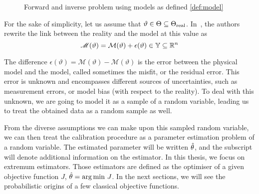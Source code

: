 \documentclass[../../Main_ManuscritThese.tex]{subfiles}
\newcommand\imgpath{/home/victor/acadwriting/Manuscrit/Text/Chapter2/img/}
\begin{document}
\begin{figure}[ht]
  \centering
  
  \caption{Forward and inverse problem using models as defined \cref{def:model}}
  \label{fig:inv_problem}
\end{figure}

% 

For the sake of simplicity, let us assume that
$\vartheta \in \Theta \subseteq
\Theta_{\mathrm{real}}$. In~\cite{kennedy_bayesian_2001,higdon_combining_2004},
the authors rewrite the link between the reality and the model at this
value as
\begin{equation}
  \label{eq:vartheta_models}
    \mathscr{M}(\vartheta) = %
    \mathcal{M}(\vartheta) + \epsilon(\vartheta) \in \Yspace \subseteq \mathbb{R}^n
  \end{equation}
 
  The difference
  $\epsilon(\vartheta) = \mathscr{M}(\vartheta) -
  \mathcal{M}(\vartheta)$ is the error between the physical model and
  the model, called sometimes the misfit, or the residual error.  This
  error is unknown and encompasses different sources of uncertainties,
  such as measurement errors, or model bias (with respect to the
  reality). To deal with this unknown, we are going to model it as a
  sample of a random variable, leading us to treat the obtained data
  as a random sample as well.

  From the diverse assumptions we can make upon this sampled random
  variable, we can then treat the calibration procedure as a parameter
  estimation problem of a random variable.  The estimated parameter
  will be written $\hat{\theta}$, and the subscript will denote
  additional information on the estimator.  In this thesis, we focus
  on extremum estimators. Those estimators are defined as the
  optimiser of a given objective function $J$,
  $\hat{\theta} = \operatorname*{arg\,min \,} J$. In the next sections, we will see the
  probabilistic origins of a few classical objective functions.
\end{document}
